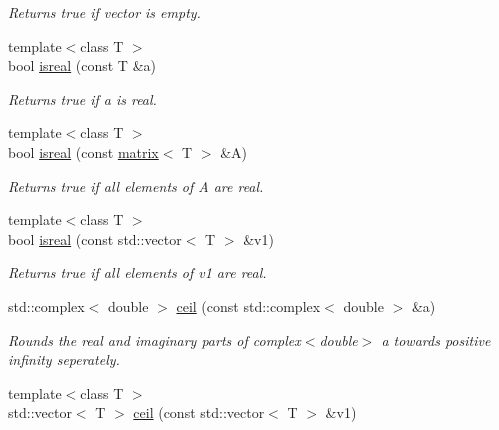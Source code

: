 \begin{DoxyCompactItemize}
\begin{DoxyCompactList}\small\item\em Returns true if vector is empty. \end{DoxyCompactList}\item 
\hypertarget{namespacekeycpp_a81a8c955cdbeb60181f6bf7d6553ac53}{{\footnotesize template$<$class T $>$ }\\bool \hyperlink{namespacekeycpp_a81a8c955cdbeb60181f6bf7d6553ac53}{isreal} (const T \&a)}\label{namespacekeycpp_a81a8c955cdbeb60181f6bf7d6553ac53}

\begin{DoxyCompactList}\small\item\em Returns true if a is real. \end{DoxyCompactList}\item 
\hypertarget{namespacekeycpp_a62d7118882bac24ab403ffb5f8ee7034}{{\footnotesize template$<$class T $>$ }\\bool \hyperlink{namespacekeycpp_a62d7118882bac24ab403ffb5f8ee7034}{isreal} (const \hyperlink{classkeycpp_1_1matrix}{matrix}$<$ T $>$ \&A)}\label{namespacekeycpp_a62d7118882bac24ab403ffb5f8ee7034}

\begin{DoxyCompactList}\small\item\em Returns true if all elements of A are real. \end{DoxyCompactList}\item 
\hypertarget{namespacekeycpp_ad811cd86faad44bdf322b55d332fee29}{{\footnotesize template$<$class T $>$ }\\bool \hyperlink{namespacekeycpp_ad811cd86faad44bdf322b55d332fee29}{isreal} (const std\-::vector$<$ T $>$ \&v1)}\label{namespacekeycpp_ad811cd86faad44bdf322b55d332fee29}

\begin{DoxyCompactList}\small\item\em Returns true if all elements of v1 are real. \end{DoxyCompactList}\item 
\hypertarget{namespacekeycpp_a005c1190f7087fb1d2545c38c080fd1a}{std\-::complex$<$ double $>$ \hyperlink{namespacekeycpp_a005c1190f7087fb1d2545c38c080fd1a}{ceil} (const std\-::complex$<$ double $>$ \&a)}\label{namespacekeycpp_a005c1190f7087fb1d2545c38c080fd1a}

\begin{DoxyCompactList}\small\item\em Rounds the real and imaginary parts of complex$<$double$>$ a towards positive infinity seperately. \end{DoxyCompactList}\item 
\hypertarget{namespacekeycpp_adb46ebfbb914f186bcb1859f39dfae91}{{\footnotesize template$<$class T $>$ }\\std\-::vector$<$ T $>$ \hyperlink{namespacekeycpp_adb46ebfbb914f186bcb1859f39dfae91}{ceil} (const std\-::vector$<$ T $>$ \&v1)}\label{namespacekeycpp_adb46ebfbb914f186bcb1859f39dfae91}


\end{DoxyCompactItemize}
